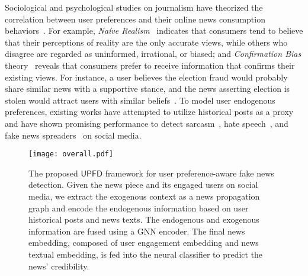 \documentclass[sigconf]{acmart}
\newcommand\UPFD{$\mathsf{UPFD}$\xspace}
\begin{document}
Sociological and psychological studies on journalism have theorized the correlation between user preferences and their online news consumption behaviors~\cite{shu2019studying}.
For example, \textit{Na\'ive Realism}~\cite{ross1995naive} indicates that consumers tend to believe that their perceptions of reality are the only accurate views, while others who disagree are regarded as uninformed, irrational, or biased;
and \textit{Confirmation Bias} theory~\cite{nickerson1998confirmation} reveals that consumers prefer to receive information that confirms their existing views.
For instance, a user believes the election fraud would probably share similar news with a supportive stance, and the news asserting election is stolen would attract users with similar beliefs~\cite{abilov2021voterfraud2020}.
To model user endogenous preferences, existing works have attempted to utilize historical posts as a proxy and have shown promising performance to detect sarcasm~\cite{khattri2015your}, hate speech~\cite{qian2018leveraging}, and fake news spreaders~\cite{rangel2020overview} on social media.


\begin{figure*}
    \centering
    \texttt{[image: overall.pdf]}
    \caption{\small The proposed \UPFD framework for user preference-aware fake news detection. Given the news piece and its engaged users on social media, we extract the exogenous context as a news propagation graph and encode the endogenous information based on user historical posts and news texts. The endogenous and exogenous information are fused using a GNN encoder. The final news embedding, composed of user engagement embedding and news textual embedding, is fed into the neural classifier to predict the news' credibility.}
    \label{fig:overall}
\end{figure*}
\end{document}
